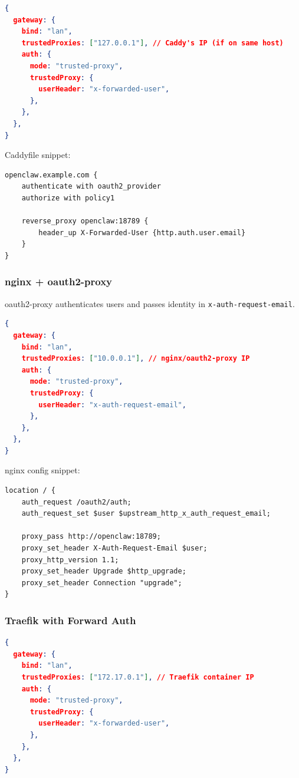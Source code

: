 \begin{lstlisting}[language=json]
{
  gateway: {
    bind: "lan",
    trustedProxies: ["127.0.0.1"], // Caddy's IP (if on same host)
    auth: {
      mode: "trusted-proxy",
      trustedProxy: {
        userHeader: "x-forwarded-user",
      },
    },
  },
}
\end{lstlisting}


Caddyfile snippet:

\begin{lstlisting}
openclaw.example.com {
    authenticate with oauth2_provider
    authorize with policy1

    reverse_proxy openclaw:18789 {
        header_up X-Forwarded-User {http.auth.user.email}
    }
}
\end{lstlisting}


\subsubsection{nginx + oauth2-proxy}


oauth2-proxy authenticates users and passes identity in \texttt{x-auth-request-email}.

\begin{lstlisting}[language=json]
{
  gateway: {
    bind: "lan",
    trustedProxies: ["10.0.0.1"], // nginx/oauth2-proxy IP
    auth: {
      mode: "trusted-proxy",
      trustedProxy: {
        userHeader: "x-auth-request-email",
      },
    },
  },
}
\end{lstlisting}


nginx config snippet:

\begin{lstlisting}
location / {
    auth_request /oauth2/auth;
    auth_request_set $user $upstream_http_x_auth_request_email;

    proxy_pass http://openclaw:18789;
    proxy_set_header X-Auth-Request-Email $user;
    proxy_http_version 1.1;
    proxy_set_header Upgrade $http_upgrade;
    proxy_set_header Connection "upgrade";
}
\end{lstlisting}


\subsubsection{Traefik with Forward Auth}


\begin{lstlisting}[language=json]
{
  gateway: {
    bind: "lan",
    trustedProxies: ["172.17.0.1"], // Traefik container IP
    auth: {
      mode: "trusted-proxy",
      trustedProxy: {
        userHeader: "x-forwarded-user",
      },
    },
  },
}
\end{lstlisting}


